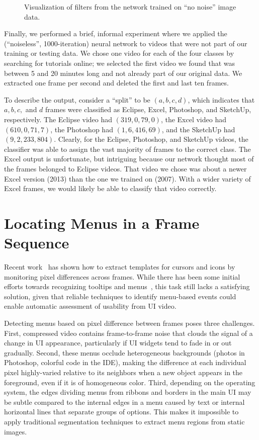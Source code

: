 \documentclass[10pt]{article}
\begin{document}
\begin{figure}[t]
\begin{minipage}{.35\textwidth}
  \caption{Visualization of filters from the network trained on ``no noise'' image data.}
  \label{fig:filters_nonoise}
  \end{minipage}
\end{figure}

Finally, we performed a brief, informal experiment where we applied the (``noiseless'',
1000-iteration) neural network to videos that were not part of our training or testing data. We
chose one video for each of the four classes by searching for tutorials online; we selected the
first video we found that was between 5 and 20 minutes long and not already part of our original
data. We extracted one frame per second and deleted the first and last ten frames.

To describe the output, consider a ``split'' to be $(a,b,c,d)$, which indicates that $a, b, c,$ and
$d$ frames were classified as Eclipse, Excel, Photoshop, and SketchUp, respectively.  The Eclipse
video had $(319,0,79,0)$, the Excel video had $(610,0,71,7)$, the Photoshop had $(1,6,416,69)$, and
the SketchUp had $(9,2,233,804)$. Clearly, for the Eclipse, Photoshop, and SketchUp videos, the
classifier was able to assign the vast majority of frames to the correct class. The Excel output is
unfortunate, but intriguing because our network thought most of the frames belonged to Eclipse
videos. That video we chose was about a newer Excel version (2013) than the one we trained on
(2007).  With a wider variety of Excel frames, we would likely be able to classify that video
correctly.

\section{Locating Menus in a Frame Sequence}\label{andrew}

Recent work~\cite{banovic_waken_2012} has shown how to extract templates for cursors and icons by
monitoring pixel differences across frames.  While there has been some initial efforts
towards recognizing tooltips and menus~\cite{banovic_waken_2012}, this task still lacks a
satisfying solution, given that reliable techniques to identify menu-based events could enable
automatic assessment of usability from UI video.

Detecting menus based on pixel difference between frames poses three challenges.  First, compressed 
video contains frame-to-frame noise that clouds the signal of a change in UI appearance, 
particularly if UI widgets tend to fade in or out gradually.  Second, these menus occlude
heterogeneous backgrounds (photos in Photoshop, colorful code in the IDE), making the difference
at each individual pixel highly-varied relative to its neighbors when a new object appears in the
foreground, even if it is of homogeneous color.  Third, depending on the operating system, 
the edges dividing menus from ribbons and borders in the main UI may be subtle compared to the
internal edges in a menu caused by text or internal horizontal lines that separate groups of options.
This makes it impossible to apply traditional segmentation techniques to extract menu regions from 
static images.
\end{document}
